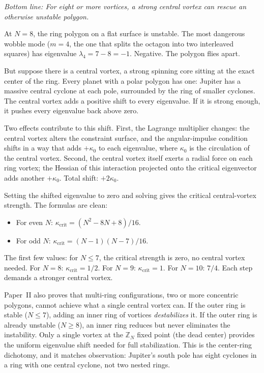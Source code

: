 \medskip

\noindent\textit{Bottom line: For eight or more vortices, a strong
central vortex can rescue an otherwise unstable polygon.}

\medskip

At $N = 8$, the ring polygon on a flat surface is unstable. The most
dangerous wobble mode ($m = 4$, the one that splits the octagon into
two interleaved squares) has eigenvalue $\lambda_4 = 7 - 8 = -1$.
Negative. The polygon flies apart.

But suppose there is a central vortex, a strong spinning core sitting
at the exact center of the ring. Every planet with a polar polygon has
one: Jupiter has a massive central cyclone at each pole, surrounded by
the ring of smaller cyclones. The central vortex adds a positive shift
to every eigenvalue. If it is strong enough, it pushes every eigenvalue
back above zero.

Two effects contribute to this shift. First, the Lagrange multiplier
changes: the central vortex alters the constraint surface, and the
angular-impulse condition shifts in a way that adds $+\kappa_0$ to each
eigenvalue, where $\kappa_0$ is the circulation of the central vortex.
Second, the central vortex itself exerts a radial force on each ring
vortex; the Hessian of this interaction projected onto the critical
eigenvector adds another $+\kappa_0$. Total shift: $+2\kappa_0$.

Setting the shifted eigenvalue to zero and solving gives the critical
central-vortex strength. The formulas are clean:
\begin{itemize}
\item For even $N$: $\kappa_{\mathrm{crit}} = (N^2 - 8N + 8)/16$.
\item For odd $N$: $\kappa_{\mathrm{crit}} = (N-1)(N-7)/16$.
\end{itemize}
The first few values: for $N \le 7$, the critical strength is zero, no
central vortex needed. For $N = 8$: $\kappa_{\mathrm{crit}} = 1/2$.
For $N = 9$: $\kappa_{\mathrm{crit}} = 1$. For $N = 10$: $7/4$.
Each step demands a stronger central vortex.

Paper~II also proves that multi-ring configurations, two or more
concentric polygons, cannot achieve what a single central vortex can.
If the outer ring is stable ($N \le 7$), adding an inner ring of
vortices \emph{destabilizes} it. If the outer ring is already unstable
($N \ge 8$), an inner ring reduces but never eliminates the
instability. Only a single vortex at the $\mathbb{Z}_N$ fixed point
(the dead center) provides the uniform eigenvalue shift needed for full
stabilization. This is the center-ring dichotomy, and it matches
observation: Jupiter's south pole has eight cyclones in a ring with one
central cyclone, not two nested rings.

